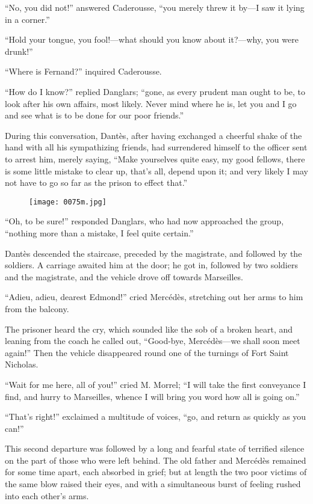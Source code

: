 “No, you did not!” answered Caderousse, “you merely threw it by—I saw
it lying in a corner.”

“Hold your tongue, you fool!—what should you know about it?—why, you
were drunk!”

“Where is Fernand?” inquired Caderousse.

“How do I know?” replied Danglars; “gone, as every prudent man ought to
be, to look after his own affairs, most likely. Never mind where he is,
let you and I go and see what is to be done for our poor friends.”

During this conversation, Dantès, after having exchanged a cheerful
shake of the hand with all his sympathizing friends, had surrendered
himself to the officer sent to arrest him, merely saying, “Make
yourselves quite easy, my good fellows, there is some little mistake to
clear up, that’s all, depend upon it; and very likely I may not have to
go so far as the prison to effect that.”

\begin{figure}[h]
\texttt{[image: 0075m.jpg]}
\end{figure}

“Oh, to be sure!” responded Danglars, who had now approached the group,
“nothing more than a mistake, I feel quite certain.”

Dantès descended the staircase, preceded by the magistrate, and
followed by the soldiers. A carriage awaited him at the door; he got
in, followed by two soldiers and the magistrate, and the vehicle drove
off towards Marseilles.

“Adieu, adieu, dearest Edmond!” cried Mercédès, stretching out her arms
to him from the balcony.

The prisoner heard the cry, which sounded like the sob of a broken
heart, and leaning from the coach he called out, “Good-bye, Mercédès—we
shall soon meet again!” Then the vehicle disappeared round one of the
turnings of Fort Saint Nicholas.

“Wait for me here, all of you!” cried M. Morrel; “I will take the first
conveyance I find, and hurry to Marseilles, whence I will bring you
word how all is going on.”

“That’s right!” exclaimed a multitude of voices, “go, and return as
quickly as you can!”

This second departure was followed by a long and fearful state of
terrified silence on the part of those who were left behind. The old
father and Mercédès remained for some time apart, each absorbed in
grief; but at length the two poor victims of the same blow raised their
eyes, and with a simultaneous burst of feeling rushed into each other’s
arms.

